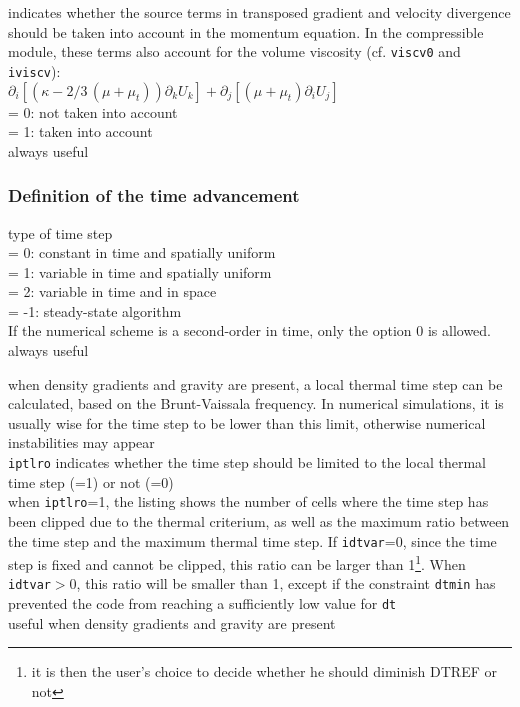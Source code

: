 {indicates whether the source terms in transposed gradient
and velocity divergence should be taken into account in the momentum
equation. In the compressible module, these terms also account for the volume
viscosity (cf. {\tt viscv0} and {\tt iviscv}):\\
$\partial_i \left[(\kappa -2/3\,(\mu+\mu_t))\partial_k U_k  \right]
 +     \partial_j \left[ (\mu+\mu_t)\partial_i U_j \right]$ \\
\hspace*{1.3cm}= 0: not taken into account\\
\hspace*{1.3cm}= 1: taken into account\\
always useful}


\subsubsection{Definition of the time advancement}

{type of time step\\
\hspace*{1.3cm}= 0: constant in time and spatially uniform\\
\hspace*{1.3cm}= 1: variable in time and spatially uniform\\
\hspace*{1.3cm}= 2: variable in time and in space\\
\hspace*{1.3cm}= -1: steady-state algorithm\\
If the numerical scheme is a second-order in time, only the option 0 is
allowed.\\
always useful}

{when density gradients and gravity are present, a local thermal time
step can be calculated, based on the Brunt-Vaissala frequency. In numerical
simulations, it is usually wise for the time step to be lower than this limit,
otherwise numerical instabilities may appear\\
{\tt iptlro} indicates whether the time step should be limited to the local thermal
time step (=1) or not (=0)\\
when {\tt iptlro}=1, the listing shows the number of cells where the time step has
been clipped due to the thermal criterium, as well as the maximum ratio between
the time step and the maximum thermal time step. If {\tt idtvar}=0, since the time
step is fixed and cannot be clipped, this ratio can be larger than
1\footnote{it is then the user's
choice to decide whether he should diminish DTREF or not}. When {\tt idtvar}$>$0, this
ratio will be smaller than 1, except if the constraint {\tt dtmin} has prevented the
code from reaching a sufficiently low value for {\tt dt}\\
useful when density gradients and gravity are present}

